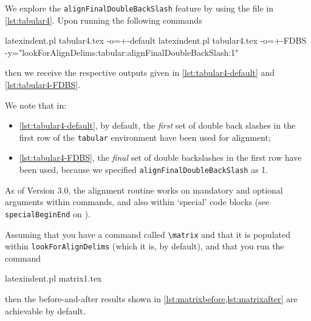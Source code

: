 \documentclass[10pt]{article}
\begin{document}
 \begin{example}
 We explore the \texttt{alignFinalDoubleBackSlash} feature by using the file in
 \cref{lst:tabular4}. Upon running the following commands   %

 \begin{commandshell}
latexindent.pl tabular4.tex -o=+-default
latexindent.pl tabular4.tex -o=+-FDBS -y="lookForAlignDelims:tabular:alignFinalDoubleBackSlash:1"
\end{commandshell}

 then we receive the respective outputs given in \cref{lst:tabular4-default} and
 \cref{lst:tabular4-FDBS}.

 \begin{cmhtcbraster}[raster columns=3,
   raster left skip=-3.75cm,
   raster right skip=-2cm,]
 \end{cmhtcbraster}

 We note that in:
 \begin{itemize}
  \item \cref{lst:tabular4-default}, by default, the \emph{first} set of double back
        slashes in the first row of the \texttt{tabular} environment have been used for
        alignment;
  \item \cref{lst:tabular4-FDBS}, the \emph{final} set of double backslashes in the
        first row have been used, because we specified \texttt{alignFinalDoubleBackSlash} as 1.
 \end{itemize}
 \end{example}

 As of Version 3.0, the alignment routine works on mandatory and optional arguments
 within commands, and also within `special' code blocks (see \texttt{specialBeginEnd} on
 ).

 \begin{example}
 Assuming that you have a command called \lstinline!\matrix! and that it is populated
 within \texttt{lookForAlignDelims} (which it is, by default), and that you run the
 command

 \begin{commandshell}
latexindent.pl matrix1.tex 
\end{commandshell}

 then the before-and-after results shown in \cref{lst:matrixbefore,lst:matrixafter} are
 achievable by default.

 \begin{cmhtcbraster}
 \end{cmhtcbraster}
 \end{example}
\end{document}
